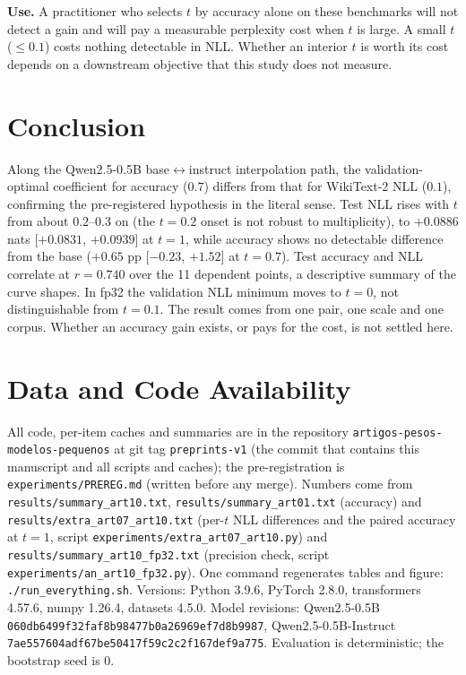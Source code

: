 \documentclass[conference]{IEEEtran}
\begin{document}
\textbf{Use.} A practitioner who selects $t$ by accuracy alone on these benchmarks will not detect a gain and will pay a measurable perplexity cost when $t$ is large. A small $t$ ($\le0.1$) costs nothing detectable in NLL. Whether an interior $t$ is worth its cost depends on a downstream objective that this study does not measure.

\section{Conclusion}
Along the Qwen2.5-0.5B base$\leftrightarrow$instruct interpolation path, the validation-optimal coefficient for accuracy ($0.7$) differs from that for WikiText-2 NLL ($0.1$), confirming the pre-registered hypothesis in the literal sense. Test NLL rises with $t$ from about $0.2$--$0.3$ on (the $t=0.2$ onset is not robust to multiplicity), to $+0.0886$ nats [$+0.0831$, $+0.0939$] at $t=1$, while accuracy shows no detectable difference from the base ($+0.65$ pp [$-0.23$, $+1.52$] at $t=0.7$). Test accuracy and NLL correlate at $r=0.740$ over the 11 dependent points, a descriptive summary of the curve shapes. In fp32 the validation NLL minimum moves to $t=0$, not distinguishable from $t=0.1$. The result comes from one pair, one scale and one corpus. Whether an accuracy gain exists, or pays for the cost, is not settled here.

\section*{Data and Code Availability}
All code, per-item caches and summaries are in the repository \texttt{artigos-pesos-modelos-pequenos} at git tag \texttt{preprints-v1} (the commit that contains this manuscript and all scripts and caches); the pre-registration is \texttt{experiments/PREREG.md} (written before any merge). Numbers come from \texttt{results/summary\_art10.txt}, \texttt{results/summary\_art01.txt} (accuracy) and \texttt{results/extra\_art07\_art10.txt} (per-$t$ NLL differences and the paired accuracy at $t=1$, script \texttt{experiments/extra\_art07\_art10.py}) and \texttt{results/summary\_art10\_fp32.txt} (precision check, script \texttt{experiments/an\_art10\_fp32.py}). One command regenerates tables and figure: \texttt{./run\_everything.sh}. Versions: Python 3.9.6, PyTorch 2.8.0, transformers 4.57.6, numpy 1.26.4, datasets 4.5.0. Model revisions: Qwen2.5-0.5B \texttt{060db6499f32faf8b98477b0a26969ef7d8b9987}, Qwen2.5-0.5B-Instruct \texttt{7ae557604adf67be50417f59c2c2f167def9a775}. Evaluation is deterministic; the bootstrap seed is 0.
\end{document}
